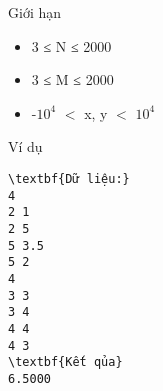 Giới hạn
\begin{itemize}
	\item     3 ≤ N ≤ 2000   
	\item     3 ≤ M ≤ 2000   
	\item     -$10^{4}$    $<$ x, y $<$ $10^{4}$
\end{itemize}
Ví dụ
\begin{verbatim}
\textbf{Dữ liệu:}
4
2 1 
2 5  
5 3.5  
5 2
4
3 3 
3 4 
4 4 
4 3  
\textbf{Kết qủa}
6.5000
\end{verbatim}